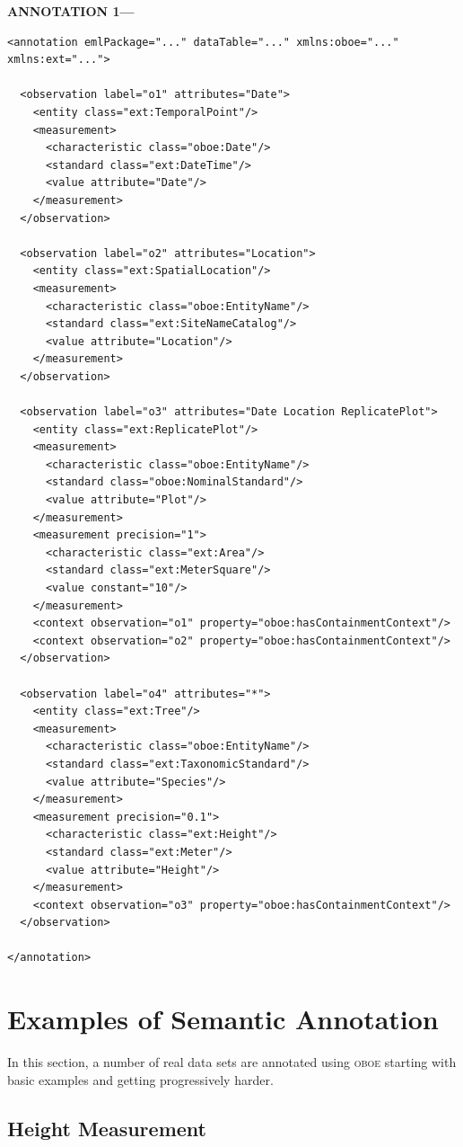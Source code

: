 \documentclass[article,oneside]{memoir}
\newcommand{\obs}{\textsc{oboe}}
\begin{document}
\newpage
\textbf{ANNOTATION 1---}
\begin{lstlisting}[frame=single]
<annotation emlPackage="..." dataTable="..." xmlns:oboe="..." xmlns:ext="...">

  <observation label="o1" attributes="Date">
    <entity class="ext:TemporalPoint"/>
    <measurement>
      <characteristic class="oboe:Date"/>
      <standard class="ext:DateTime"/>
      <value attribute="Date"/>
    </measurement>
  </observation>

  <observation label="o2" attributes="Location">
    <entity class="ext:SpatialLocation"/>
    <measurement>
      <characteristic class="oboe:EntityName"/>
      <standard class="ext:SiteNameCatalog"/>
      <value attribute="Location"/>
    </measurement>
  </observation>

  <observation label="o3" attributes="Date Location ReplicatePlot">
    <entity class="ext:ReplicatePlot"/>
    <measurement>
      <characteristic class="oboe:EntityName"/>
      <standard class="oboe:NominalStandard"/>
      <value attribute="Plot"/>
    </measurement>
    <measurement precision="1">
      <characteristic class="ext:Area"/>
      <standard class="ext:MeterSquare"/>
      <value constant="10"/>
    </measurement>
    <context observation="o1" property="oboe:hasContainmentContext"/>
    <context observation="o2" property="oboe:hasContainmentContext"/>
  </observation>

  <observation label="o4" attributes="*">
    <entity class="ext:Tree"/>
    <measurement>
      <characteristic class="oboe:EntityName"/>
      <standard class="ext:TaxonomicStandard"/>
      <value attribute="Species"/>
    </measurement>
    <measurement precision="0.1">
      <characteristic class="ext:Height"/>
      <standard class="ext:Meter"/>
      <value attribute="Height"/>
    </measurement>
    <context observation="o3" property="oboe:hasContainmentContext"/>
  </observation>

</annotation>
\end{lstlisting}


\clearpage

\chapter{Examples of Semantic Annotation}

In this section, a number of real data sets are annotated using \obs{} starting with basic examples and getting progressively harder.

\section{Height Measurement}
\end{document}
